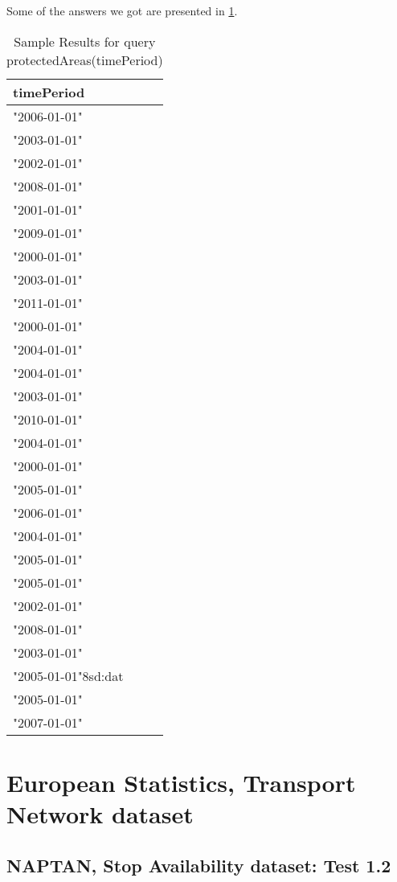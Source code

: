 \documentclass[a4paper,10pt]{article}
\begin{document}
		
	Some of the answers we got are presented in  \ref{protectedAreas(timePeriod)}.

			
		
\begin{table}

\caption{Sample Results for query protectedAreas(timePeriod)}
\begin{center}
\begin{tabular}{l }
\hline
timePeriod \\ \hline

 "2006-01-01" \\
 "2003-01-01" \\
 "2002-01-01" \\
 "2008-01-01" \\
"2001-01-01" \\
 "2009-01-01" \\
"2000-01-01" \\
 "2003-01-01" \\
  "2011-01-01" \\
 "2000-01-01" \\
 "2004-01-01" \\
  "2004-01-01" \\
"2003-01-01" \\
"2010-01-01" \\
 "2004-01-01" \\
 "2000-01-01" \\
 "2005-01-01" \\
 "2006-01-01" \\
 "2004-01-01" \\
 "2005-01-01" \\
 "2005-01-01"\\
 "2002-01-01" \\
 "2008-01-01" \\
  "2003-01-01" \\
 "2005-01-01"^^xsd:dat \\
 "2005-01-01"\\
 "2007-01-01" \\
\end{tabular}
\label{protectedAreas(timePeriod)}
\end{center}
\end{table}	
		
\section{European Statistics, Transport Network dataset}
\label{Transport Network, NAPTAN Query}
	\subsection{NAPTAN, Stop Availability dataset: Test 1.2}
	
\end{document}
